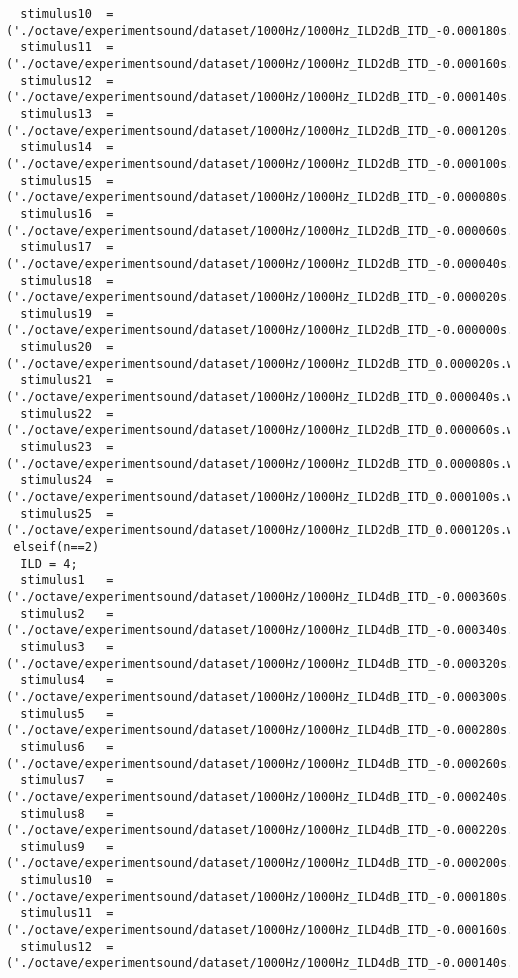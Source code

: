 {\begin{verbatim}
  stimulus10  =('./octave/experimentsound/dataset/1000Hz/1000Hz_ILD2dB_ITD_-0.000180s.wav');
  stimulus11  =('./octave/experimentsound/dataset/1000Hz/1000Hz_ILD2dB_ITD_-0.000160s.wav');
  stimulus12  =('./octave/experimentsound/dataset/1000Hz/1000Hz_ILD2dB_ITD_-0.000140s.wav');
  stimulus13  =('./octave/experimentsound/dataset/1000Hz/1000Hz_ILD2dB_ITD_-0.000120s.wav');
  stimulus14  =('./octave/experimentsound/dataset/1000Hz/1000Hz_ILD2dB_ITD_-0.000100s.wav');
  stimulus15  =('./octave/experimentsound/dataset/1000Hz/1000Hz_ILD2dB_ITD_-0.000080s.wav');
  stimulus16  =('./octave/experimentsound/dataset/1000Hz/1000Hz_ILD2dB_ITD_-0.000060s.wav');
  stimulus17  =('./octave/experimentsound/dataset/1000Hz/1000Hz_ILD2dB_ITD_-0.000040s.wav');
  stimulus18  =('./octave/experimentsound/dataset/1000Hz/1000Hz_ILD2dB_ITD_-0.000020s.wav');
  stimulus19  =('./octave/experimentsound/dataset/1000Hz/1000Hz_ILD2dB_ITD_-0.000000s.wav');
  stimulus20  =('./octave/experimentsound/dataset/1000Hz/1000Hz_ILD2dB_ITD_0.000020s.wav');
  stimulus21  =('./octave/experimentsound/dataset/1000Hz/1000Hz_ILD2dB_ITD_0.000040s.wav');
  stimulus22  =('./octave/experimentsound/dataset/1000Hz/1000Hz_ILD2dB_ITD_0.000060s.wav');
  stimulus23  =('./octave/experimentsound/dataset/1000Hz/1000Hz_ILD2dB_ITD_0.000080s.wav');
  stimulus24  =('./octave/experimentsound/dataset/1000Hz/1000Hz_ILD2dB_ITD_0.000100s.wav');
  stimulus25  =('./octave/experimentsound/dataset/1000Hz/1000Hz_ILD2dB_ITD_0.000120s.wav');
 elseif(n==2)
  ILD = 4;
  stimulus1   =('./octave/experimentsound/dataset/1000Hz/1000Hz_ILD4dB_ITD_-0.000360s.wav');
  stimulus2   =('./octave/experimentsound/dataset/1000Hz/1000Hz_ILD4dB_ITD_-0.000340s.wav');
  stimulus3   =('./octave/experimentsound/dataset/1000Hz/1000Hz_ILD4dB_ITD_-0.000320s.wav');
  stimulus4   =('./octave/experimentsound/dataset/1000Hz/1000Hz_ILD4dB_ITD_-0.000300s.wav');
  stimulus5   =('./octave/experimentsound/dataset/1000Hz/1000Hz_ILD4dB_ITD_-0.000280s.wav');
  stimulus6   =('./octave/experimentsound/dataset/1000Hz/1000Hz_ILD4dB_ITD_-0.000260s.wav');
  stimulus7   =('./octave/experimentsound/dataset/1000Hz/1000Hz_ILD4dB_ITD_-0.000240s.wav');
  stimulus8   =('./octave/experimentsound/dataset/1000Hz/1000Hz_ILD4dB_ITD_-0.000220s.wav');
  stimulus9   =('./octave/experimentsound/dataset/1000Hz/1000Hz_ILD4dB_ITD_-0.000200s.wav');
  stimulus10  =('./octave/experimentsound/dataset/1000Hz/1000Hz_ILD4dB_ITD_-0.000180s.wav');
  stimulus11  =('./octave/experimentsound/dataset/1000Hz/1000Hz_ILD4dB_ITD_-0.000160s.wav');
  stimulus12  =('./octave/experimentsound/dataset/1000Hz/1000Hz_ILD4dB_ITD_-0.000140s.wav');

\end{verbatim}}
